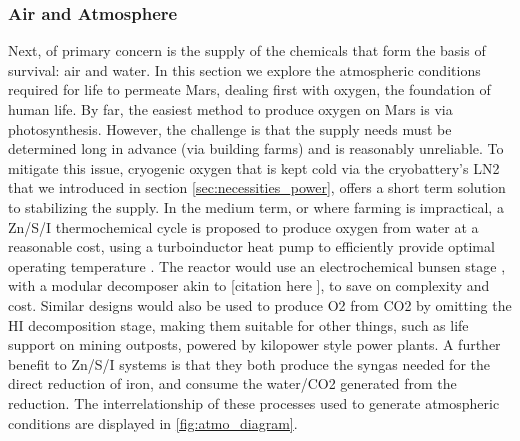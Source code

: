\documentclass[fleqn,10pt]{Stylesheet} %
\begin{document}
\subsubsection{Air and Atmosphere}
\label{sec:necessities_air}



Next, of primary concern is the supply of the chemicals that form the basis of survival: air and water. In this section we explore the atmospheric conditions required for life to permeate Mars, dealing first with oxygen, the foundation of human life. By far, the easiest method to produce oxygen on Mars is via photosynthesis. However, the challenge is that the supply needs must be determined long in advance (via building farms) and is reasonably unreliable. To mitigate this issue, cryogenic oxygen that is kept cold via the cryobattery’s LN2 that we introduced in section \ref{sec:necessities_power}, offers a short term solution to stabilizing the supply. In the medium term, or where farming is impractical, a Zn/S/I thermochemical cycle \cite{YanweiZhang2013} is proposed to produce oxygen from water at a reasonable cost, using a turboinductor heat pump to efficiently provide optimal operating temperature \cite{JohnBucknellVideo, 2013Dujarric}. The reactor would use an electrochemical bunsen stage \cite{YanweiZhang2016}, with a modular decomposer akin to [citation here ], to save on complexity and cost. Similar designs would also be used to produce O2 from CO2 by omitting the HI decomposition stage, making them suitable for other things, such as life support on mining outposts, powered by kilopower style power plants. A further benefit to Zn/S/I systems is that they both produce the syngas needed for the direct reduction of iron, and consume the water/CO2 generated from the reduction. The interrelationship of these processes used to generate atmospheric conditions are displayed in \ref{fig:atmo_diagram}. 
\end{document}
